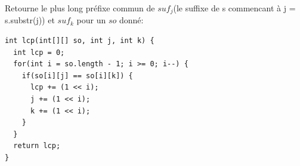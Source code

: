 Retourne le plus long préfixe commun de $suf_j$(le suffixe de s commencant à j = s.substr(j)) et $suf_k$ pour un $so$ donné:\ \newline
\begin{lstlisting}
int lcp(int[][] so, int j, int k) {
  int lcp = 0;
  for(int i = so.length - 1; i >= 0; i--) {
    if(so[i][j] == so[i][k]) {
      lcp += (1 << i);
      j += (1 << i);
      k += (1 << i);
    }
  }
  return lcp;
}
\end{lstlisting}